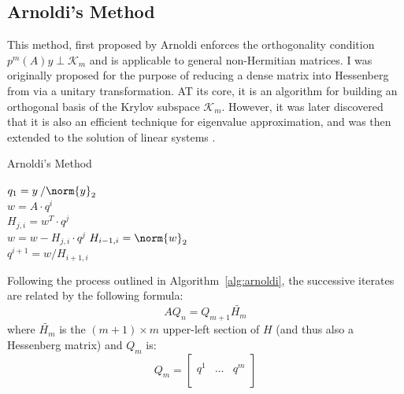 \subsection{Arnoldi's Method}
\label{sec:arnoldi}
This method, first proposed by Arnoldi \cite{arnoldi_principle_1951} enforces the orthogonality condition $p^m(A)y \perp \mathcal{K}_m$ and is applicable to general non-Hermitian matrices. I was originally proposed for the purpose of reducing a dense matrix into Hessenberg from via a unitary transformation. AT its core, it is an algorithm for building an orthogonal basis of the Krylov subspace $\mathcal{K}_m$. However, it was later discovered that it is also an efficient technique for eigenvalue approximation, and was then extended to the solution of linear systems \cite{saad_iterative_2003}. 

\begin{algorithm}[h]
  \caption{Arnoldi's Method}
  \label{alg:arnoldi}
  \SetAlgoLined
  $q_1= y\:/\norm{y}_2$ \\
   {
    $w =A\cdot q^i$ \\
     {
      $H_{j,i} = w^T\cdot q^j$ \\
      $ w = w - H_{j,i}\cdot q^j$}
    $H_{i-1,i} = \norm{w}_2$ \\
    $q^{i+1} = w/H_{i+1,i}$
  }
\end{algorithm}

\noindent Following the process outlined in Algorithm~\hyperref[alg:arnoldi]{\ref{alg:arnoldi}}, the successive iterates are related by the following formula:
\begin{equation}
AQ_n=Q_{m+1}\tilde{H_m}
\end{equation}
\noindent where $\tilde{H_m}$ is the $(m+1) \times m$ upper-left section of $H$ (and thus also a Hessenberg matrix) and $Q_m$ is:
\begin{equation}
  Q_m =
  \left[
    \begin{array}{c|c|c}
      & & \\
      q^1 &\dots & q^m \\
      & & \\
    \end{array}
  \right] 
\end{equation}

